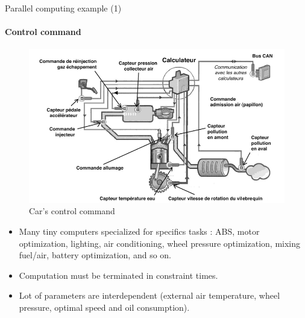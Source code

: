 \documentclass[compress,10pt,aspectratio=169]{beamer}
\begin{document}
\begin{frame}[fragile]{Parallel computing example (1)}
    \framesubtitle{Control command}
    \small
    \begin{multicols}{2}
    \begin{figure}[h]      
    \includegraphics[width=\linewidth]{../Images/ControleCommande.png}
    \caption{Car's control command}
    \end{figure}
    \begin{itemize}
        \item Many tiny computers specialized for specifics tasks : ABS, motor optimization, lighting, air conditioning, wheel pressure optimization, 
              mixing fuel/air, battery optimization, and so on.
        \item Computation must be terminated in constraint times.
        \item Lot of parameters are interdependent (external air temperature, wheel pressure, optimal speed and oil consumption).
    \end{itemize}
    \end{multicols}
\end{frame}
\end{document}
